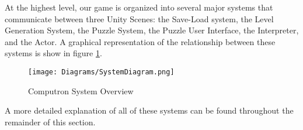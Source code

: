 At the highest level, our game is organized into several major systems that communicate between three Unity Scenes: the Save-Load system, the Level Generation System, the Puzzle System, the Puzzle User Interface, the Interpreter, and the Actor. A graphical representation of the relationship between these systems is show in figure \ref{fig:overall_system_diagram}.

\begin{figure}[!hb]
    \caption{Computron System Overview}
    \label{fig:overall_system_diagram}
    \centering
    \texttt{[image: Diagrams/SystemDiagram.png]}
\end{figure}

A more detailed explanation of all of these systems can be found throughout the remainder of this section.
